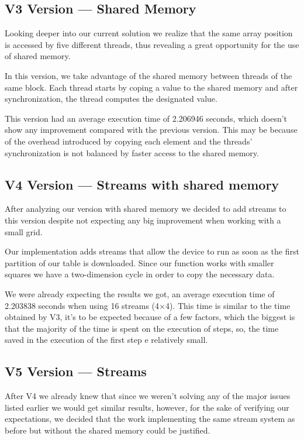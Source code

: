 \documentclass[conference]{IEEEtran}
\begin{document}


\subsection{V3 Version --- Shared Memory}
Looking deeper into our current solution we realize that the same array position is accessed by five different threads, thus revealing a great opportunity for the use of shared memory.

In this version, we take advantage of the shared memory between threads of the same block. Each thread starts by coping a value to the shared memory and after synchronization, the thread computes the designated value.

This version had an average execution time of 2.206946 seconds, which doesn't show any improvement compared with the previous version. This may be because of the overhead introduced by copying each element and the threads' synchronization is not balanced by faster access to the shared memory.


\subsection{V4 Version --- Streams with shared memory}
After analyzing our version with shared memory we decided to add streams to this version despite not expecting any big improvement when working with a small grid.

Our implementation adds streams that allow the device to run as soon as the first partition of our table is downloaded. Since our function works with smaller squares we have a two-dimension cycle in order to copy the necessary data.

We were already expecting the results we got, an average execution time of 2.203838 seconds when using 16 streams (4$\times$4). This time is similar to the time obtained by V3, it's to be expected because of a few factors, which the biggest is that the majority of the time is spent on the execution of steps, so, the time saved in the execution of the first step e relatively small.


\subsection{V5 Version --- Streams}
After V4 we already knew that since we weren't solving any of the major issues listed earlier we would get similar results, however, for the sake of verifying our expectations, we decided that the work implementing the same stream system as before but without the shared memory could be justified.
\end{document}

